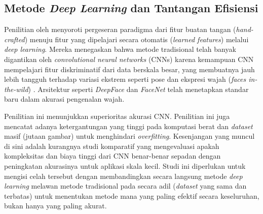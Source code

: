 \subsection{Metode \textit{Deep Learning} dan Tantangan Efisiensi}

Penilitian oleh \textcite{Trigueros2018} menyoroti pergeseran paradigma dari fitur buatan tangan (\textit{hand-crafted}) menuju fitur yang dipelajari secara otomatis (\textit{learned features}) melalui \textit{deep learning}. Mereka menegaskan bahwa metode tradisional telah banyak digantikan oleh \textit{convolutional neural networks} (CNNs) karena kemampuan CNN mempelajari fitur diskriminatif dari data berskala besar, yang membuatnya jauh lebih tangguh terhadap variasi ekstrem seperti pose dan ekspresi wajah (\textit{faces in-the-wild}) . Arsitektur seperti \textit{DeepFace} dan \textit{FaceNet} telah menetapkan standar baru dalam akurasi pengenalan wajah.

Penilitian ini menunjukkan superioritas akurasi CNN. Penilitian ini juga mencatat adanya ketergantungan yang tinggi pada komputasi berat dan \textit{dataset} masif (jutaan gambar) untuk menghindari \textit{overfitting}. Kesenjangan yang muncul di sini adalah kurangnya studi komparatif yang mengevaluasi apakah kompleksitas dan biaya tinggi dari CNN benar-benar sepadan dengan peningkatan akurasinya untuk aplikasi skala kecil. Studi ini diperlukan untuk mengisi celah tersebut dengan membandingkan secara langsung metode \textit{deep learning} melawan metode tradisional pada secara adil (\textit{dataset} yang sama dan terbatas) untuk menentukan metode mana yang paling efektif secara keseluruhan, bukan hanya yang paling akurat.

